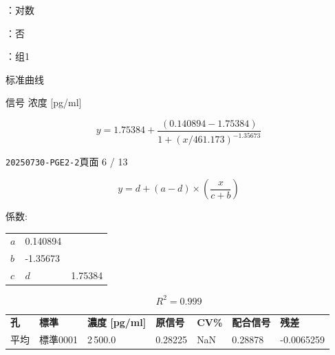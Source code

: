 \documentclass[UTF8,10pt,a4paper,fontset=fandol]{ctexart}
\newcommand{\fieldvalue}[1]{#1}
\begin{document}
\begin{center}
\begin{center}
：\fieldvalue{对数}

：\fieldvalue{否}

：\fieldvalue{组1}

\begin{center}
\large 标准曲线
\end{center}

\begin{center}
\end{center}

\begin{center}
\small
信号 \hspace{5cm} 浓度 [pg/ml]
\end{center}

\[
y = 1.75384 + \frac{(0.140894 - 1.75384)}
 {1 + (x/461.173)^{-1.35673}}
\]

\newpage

\texttt{20250730-PGE2-2}\hfill 頁面 6 / 13

\[
y=d+(a-d)\times\left(\frac{x}{c+b}\right)
\]

係数:

\begin{tabular}{ll}
$a$ &
\fieldvalue{0.140894} \\[2pt]
$b$ &
\fieldvalue{-1.35673} \\[2pt]
$c$ &
$d$ &
\fieldvalue{1.75384}
\end{tabular}

\[
R^2 =
\fieldvalue{0.999}
\]

\small
\begin{tabularx}{\textwidth}{l l l l l l l}
\textbf{孔} & \textbf{標準} & \textbf{濃度 [pg/ml]} &
\textbf{原信号} & \textbf{CV\%} & \textbf{配合信号} & \textbf{残差} \\
平均 &
\fieldvalue{標準0001} &
\fieldvalue{2\,500.0} &
\fieldvalue{0.28225} &
\fieldvalue{NaN} &
\fieldvalue{0.28878} &
\fieldvalue{-0.0065259} \\


\end{tabularx}
\end{center}
\end{center}
\end{document}
